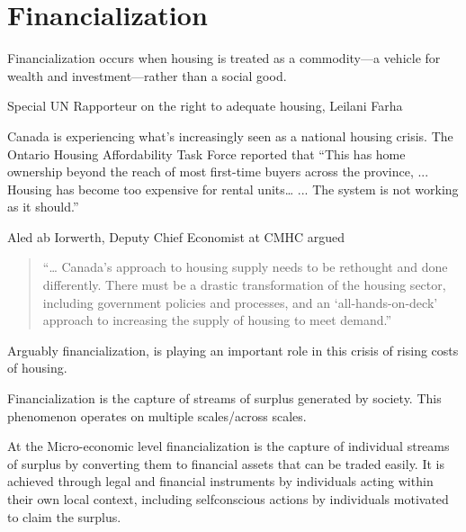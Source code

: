 \chapter{Financialization} \label{chapter-financialization}
\epigraph{Financialization  occurs when housing is treated as a commodity—a vehicle for wealth and investment—rather than a social good.}{Special UN Rapporteur on the right to adequate housing, Leilani Farha}


Canada is experiencing what's increasingly seen as a national housing crisis. The Ontario Housing Affordability Task Force reported that ``This has home ownership beyond the reach of most first-time buyers across the province, ... Housing has become too expensive for rental units…  ... %
The system is not working as it should.''

Aled ab Iorwerth, Deputy Chief Economist at CMHC argued
\begin{quotation}
     “… Canada’s approach to housing supply needs to be rethought and done differently. There must be a drastic transformation of the housing sector, including government policies and processes, and an ‘all-hands-on-deck’ approach to increasing the supply of housing to meet demand.”\cite{CanadaHousingSupply2022}
\end{quotation}

Arguably financialization, %
is playing an important role in this crisis of rising costs of housing.



Financialization is the capture of  streams of surplus generated by society. This phenomenon operates on multiple scales/across scales.

At the Micro-economic level financialization is the capture of individual streams of surplus by converting them to financial assets that can be traded easily. It is achieved through legal and financial instruments by individuals acting within their own local context, including selfconscious actions by individuals motivated to claim the surplus.


